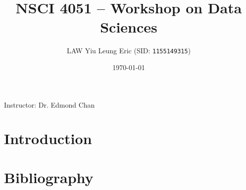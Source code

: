\documentclass[11pt,a4paper]{article}
\begin{document}
    
    \thispagestyle{empty}
    \title{\textsc{NSCI 4051} -- Workshop on Data Sciences}
    \author{
        LAW Yiu Leung Eric (SID: \texttt{1155149315})
    }
    \date{\today}
    \maketitle

    \begin{center}
        Instructor: Dr. Edmond Chan
    \end{center}
    
    \pagestyle{plain} 
    
    \tableofcontents
    \listoffigures
    \listoftables
    
    \newpage
    
    \pagestyle{fancy}
    \setcounter{page}{1}
    
    \section{Introduction}
    
    
    
    \section{Bibliography}
    
    
\end{document}
